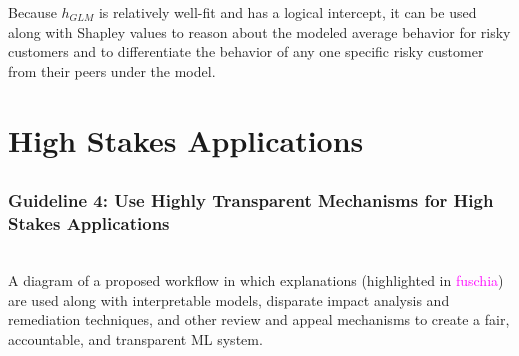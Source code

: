\documentclass[11pt,
               aspectratio=169,
               hyperref={colorlinks}
               ]{beamer}
\begin{document}
\begin{frame}[t, label={lime}]
	\scriptsize{Because $h_{GLM}$ is relatively well-fit and has a logical intercept, it can be used along with Shapley values to reason about the modeled average behavior for risky customers and to differentiate the behavior of any one specific risky customer from their peers under the model.}

	\end{frame}


	\section{High Stakes Applications}

	\subsection*{} %

	\begin{frame}
	
		\frametitle{\normalsize{\textbf{Guideline 4}: Use Highly Transparent Mechanisms for High Stakes Applications}}
		\vspace{2pt}
		\\
		\vspace{5pt}
		\scriptsize{A diagram of a proposed workflow in which explanations (highlighted in \textcolor{magenta}{fuschia}) are used along with interpretable models, disparate impact analysis and remediation techniques, and other review and appeal mechanisms to create a fair, accountable, and transparent ML system.}
	
	\end{frame}
\end{document}
